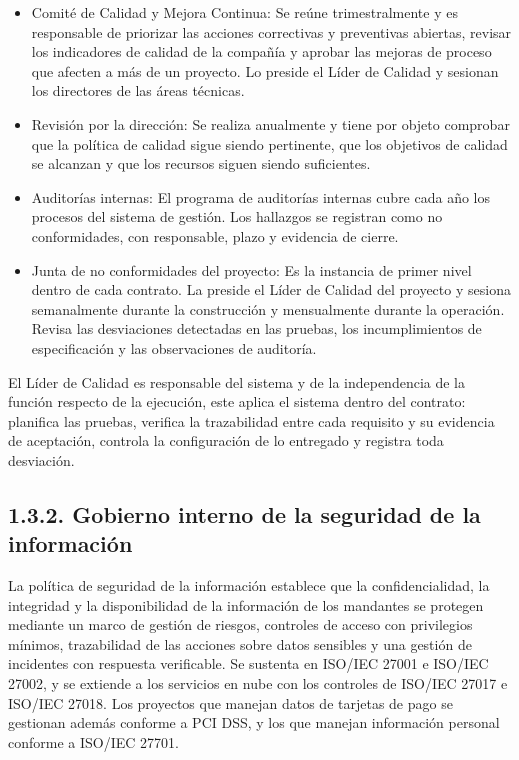 \documentclass[11pt]{article}
\providecommand{\tightlist}{%
  \setlength{\itemsep}{0pt}\setlength{\parskip}{0pt}}
\begin{document}
\begin{itemize}
\tightlist
\item
  Comité de Calidad y Mejora Continua: Se reúne trimestralmente y es responsable de priorizar las acciones correctivas y preventivas abiertas, revisar los indicadores de calidad de la compañía y aprobar las mejoras de proceso que afecten a más de un proyecto. Lo preside el Líder de Calidad y sesionan los directores de las áreas técnicas.
\item
  Revisión por la dirección: Se realiza anualmente y tiene por objeto comprobar que la política de calidad sigue siendo pertinente, que los objetivos de calidad se alcanzan y que los recursos siguen siendo suficientes.
\item
  Auditorías internas: El programa de auditorías internas cubre cada año los procesos del sistema de gestión. Los hallazgos se registran como no conformidades, con responsable, plazo y evidencia de cierre.
\item
  Junta de no conformidades del proyecto: Es la instancia de primer nivel dentro de cada contrato. La preside el Líder de Calidad del proyecto y sesiona semanalmente durante la construcción y mensualmente durante la operación. Revisa las desviaciones detectadas en las pruebas, los incumplimientos de especificación y las observaciones de auditoría.
\end{itemize}

El Líder de Calidad es responsable del sistema y de la independencia de la función respecto de la ejecución, este aplica el sistema dentro del contrato: planifica las pruebas, verifica la trazabilidad entre cada requisito y su evidencia de aceptación, controla la configuración de lo entregado y registra toda desviación.

\subsection{1.3.2. Gobierno interno de la seguridad de la información}\label{gobierno-interno-de-la-seguridad-de-la-informaciuxf3n}

La política de seguridad de la información establece que la confidencialidad, la integridad y la disponibilidad de la información de los mandantes se protegen mediante un marco de gestión de riesgos, controles de acceso con privilegios mínimos, trazabilidad de las acciones sobre datos sensibles y una gestión de incidentes con respuesta verificable. Se sustenta en ISO/IEC 27001 e ISO/IEC 27002, y se extiende a los servicios en nube con los controles de ISO/IEC 27017 e ISO/IEC 27018. Los proyectos que manejan datos de tarjetas de pago se gestionan además conforme a PCI DSS, y los que manejan información personal conforme a ISO/IEC 27701.
\end{document}
